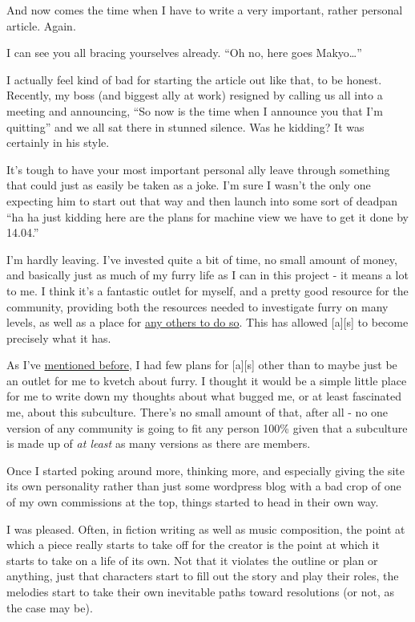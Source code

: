 And now comes the time when I have to write a very important, rather
personal article. Again.

I can see you all bracing yourselves already. ``Oh no, here goes
Makyo\ldots{}''

I actually feel kind of bad for starting the article out like that, to
be honest. Recently, my boss (and biggest ally at work) resigned by
calling us all into a meeting and announcing, ``So now is the time when
I announce you that I'm quitting'' and we all sat there in stunned
silence. Was he kidding? It was certainly in his style.

It's tough to have your most important personal ally leave through
something that could just as easily be taken as a joke. I'm sure I
wasn't the only one expecting him to start out that way and then launch
into some sort of deadpan ``ha ha just kidding here are the plans for
machine view we have to get it done by 14.04.''

I'm hardly leaving. I've invested quite a bit of time, no small amount
of money, and basically just as much of my furry life as I can in this
project - it means a lot to me. I think it's a fantastic outlet for
myself, and a pretty good resource for the community, providing both the
resources needed to investigate furry on many levels, as well as a place
for \href{http://adjectivespecies.com/contributing/}{any others to do
so}. This has allowed {[}a{]}{[}s{]} to become precisely what it has.

As I've
\href{http://adjectivespecies.com/2012/03/21/makyos-kaddish/}{mentioned
before}, I had few plans for {[}a{]}{[}s{]} other than to maybe just be
an outlet for me to kvetch about furry. I thought it would be a simple
little place for me to write down my thoughts about what bugged me, or
at least fascinated me, about this subculture. There's no small amount
of that, after all - no one version of any community is going to fit any
person 100\% given that a subculture is made up of \emph{at least} as
many versions as there are members.

Once I started poking around more, thinking more, and especially giving
the site its own personality rather than just some wordpress blog with a
bad crop of one of my own commissions at the top, things started to head
in their own way.

I was pleased. Often, in fiction writing as well as music composition,
the point at which a piece really starts to take off for the creator is
the point at which it starts to take on a life of its own. Not that it
violates the outline or plan or anything, just that characters start to
fill out the story and play their roles, the melodies start to take
their own inevitable paths toward resolutions (or not, as the case may
be).

